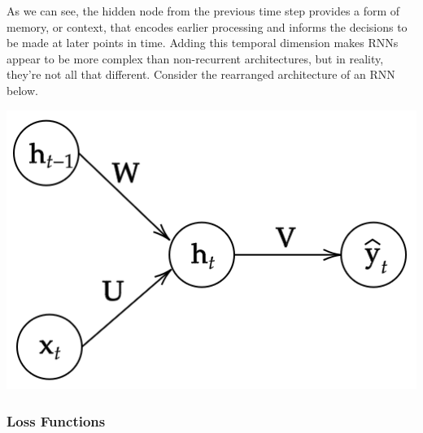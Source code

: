 \documentclass{article}
\begin{document}
    As we can see, the hidden node from the previous time step provides a form of memory, or context, that encodes earlier processing and informs the decisions to be made at later points in time. Adding this temporal dimension makes RNNs appear to be more complex than non-recurrent architectures, but in reality, they’re not all that different. Consider the rearranged architecture of an RNN below. 
    \begin{center}
        \includegraphics[scale=0.3]{img/04_RNN/RNN_as_MLP.png}
    \end{center}

    \subsubsection{Loss Functions}
\end{document}
